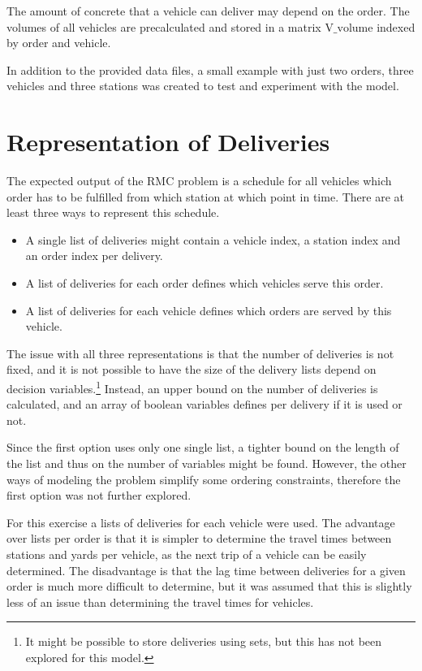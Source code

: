 \documentclass[a4paper]{article}
\newcommand{\Vvolume}{\text{V\_volume}}
\begin{document}
The amount of concrete that a vehicle can deliver may depend on the order. The volumes of all vehicles are precalculated
and stored in a matrix $\Vvolume$ indexed by order and vehicle.

\medskip
In addition to the provided data files, a small example with just two orders, three vehicles and three stations was
created to test and experiment with the model.

\section{Representation of Deliveries}

The expected output of the RMC problem is a schedule for all vehicles which order has to be fulfilled from which
station at which point in time. There are at least three ways to represent this schedule. 

\begin{itemize}
\item A single list of deliveries
 might contain a vehicle index, a station index and an order index per delivery.

\item A list of deliveries for each order defines which vehicles serve this order.

\item A list of deliveries for each vehicle defines which orders are served by this vehicle.
\end{itemize}

The issue with all three representations is that the number of deliveries is not fixed, and it is not possible to have
the size of the delivery lists depend on decision variables.\footnote{It might be possible to store deliveries using
sets, but this has not been explored for this model.}
Instead, an upper bound on the number of deliveries is calculated, and an array of boolean variables defines per
delivery if it is used or not.

Since the first option uses only one single list, a tighter bound on the length of the list and thus on the number of
variables might be found. However, the other ways of modeling the problem simplify some ordering constraints, therefore
the first option was not further explored.

For this exercise a lists of deliveries for each vehicle were used. The advantage over lists per order is that it is
simpler to determine the travel times between stations and yards per vehicle, as the next trip of a vehicle can
be easily determined. The disadvantage is that the lag time between deliveries for a given order is much more difficult
to determine, but it was assumed that this is slightly less of an issue than determining the travel times for vehicles.
\end{document}
